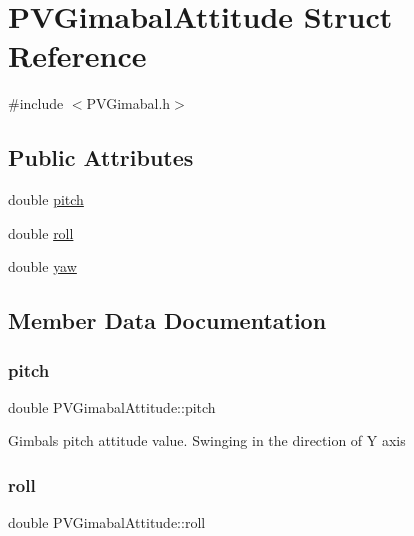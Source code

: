 \hypertarget{struct_p_v_gimabal_attitude}{}\section{P\+V\+Gimabal\+Attitude Struct Reference}
\label{struct_p_v_gimabal_attitude}


{\ttfamily \#include $<$P\+V\+Gimabal.\+h$>$}

\subsection*{Public Attributes}
\begin{DoxyCompactItemize}
\item 
double \hyperlink{struct_p_v_gimabal_attitude_ac38c5044d88f34f4b9c89ee75d1b27c7}{pitch}
\item 
double \hyperlink{struct_p_v_gimabal_attitude_ae80ea45195ccd438c706f3d43ee0968c}{roll}
\item 
double \hyperlink{struct_p_v_gimabal_attitude_a5429d6588fd4224d15603e2100482020}{yaw}
\end{DoxyCompactItemize}


\subsection{Member Data Documentation}
\mbox{\label{struct_p_v_gimabal_attitude_ac38c5044d88f34f4b9c89ee75d1b27c7}} 
\subsubsection{\texorpdfstring{pitch}{pitch}}
{\footnotesize\ttfamily double P\+V\+Gimabal\+Attitude\+::pitch}

Gimbal\textquotesingle{}s pitch attitude value. Swinging in the direction of Y axis \mbox{\label{struct_p_v_gimabal_attitude_ae80ea45195ccd438c706f3d43ee0968c}} 
\subsubsection{\texorpdfstring{roll}{roll}}
{\footnotesize\ttfamily double P\+V\+Gimabal\+Attitude\+::roll}

